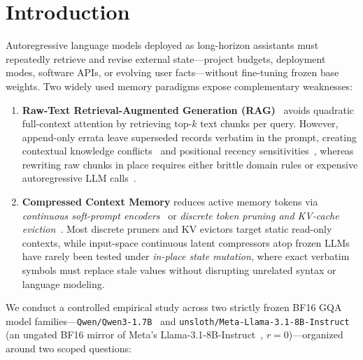 \documentclass[11pt]{article}
\renewcommand{\_}{\origunderscore\allowbreak}
\begin{document}
\section{Introduction}
\label{sec:intro}

Autoregressive language models deployed as long-horizon assistants must repeatedly retrieve and revise external state---project budgets, deployment modes, software APIs, or evolving user facts---without fine-tuning frozen base weights. Two widely used memory paradigms expose complementary weaknesses:

\begin{enumerate}
    \item \textbf{Raw-Text Retrieval-Augmented Generation (RAG)}~\cite{lewis2020rag,robertson2009bm25,xiao2024bge} avoids quadratic full-context attention by retrieving top-$k$ text chunks per query. However, append-only errata leave superseded records verbatim in the prompt, creating contextual knowledge conflicts~\cite{longpre2021conflict} and positional recency sensitivities~\cite{liu2024lost}, whereas rewriting raw chunks in place requires either brittle domain rules or expensive autoregressive LLM calls~\cite{packer2023memgpt,chhikara2025mem0}.
    \item \textbf{Compressed Context Memory} reduces active memory tokens via \emph{continuous soft-prompt encoders}~\cite{mu2023gist,chevalier2023autocompressors,ge2024icae,cheng2024xrag,li2025compressor500x,fallahpour2026memorilla} or \emph{discrete token pruning and KV-cache eviction}~\cite{pan2024llmlingua2,chirkova2025provence,zhang2023h2o,li2024snapkv}. Most discrete pruners and KV evictors target static read-only contexts, while input-space continuous latent compressors atop frozen LLMs have rarely been tested under \emph{in-place state mutation}, where exact verbatim symbols must replace stale values without disrupting unrelated syntax or language modeling.
\end{enumerate}

We conduct a controlled empirical study across two strictly frozen BF16 GQA model families---\texttt{Qwen/Qwen3-1.7B}~\cite{yang2025qwen3} and \texttt{unsloth/Meta-Llama-3.1-8B-Instruct} (an ungated BF16 mirror of Meta's Llama-3.1-8B-Instruct~\cite{dubey2024llama3}, $r=0$)---organized around two scoped questions:
\end{document}
